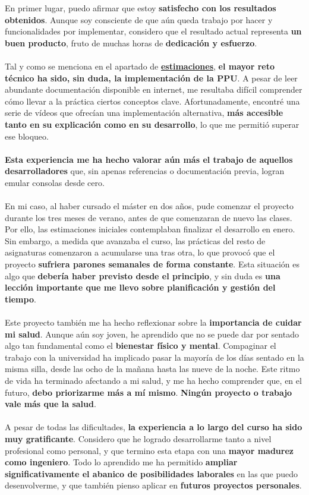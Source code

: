En primer lugar, puedo afirmar que estoy \textbf{satisfecho con los resultados obtenidos}. Aunque soy consciente de que aún queda trabajo por hacer y funcionalidades por implementar, considero que el resultado actual representa \textbf{un buen producto}, fruto de muchas horas de \textbf{dedicación y esfuerzo}.
\\\\
Tal y como se menciona en el apartado de \hyperref[estimaciones]{\textbf{estimaciones}}, \textbf{el mayor reto técnico ha sido, sin duda, la implementación de la PPU}. A pesar de leer abundante documentación disponible en internet, me resultaba difícil comprender cómo llevar a la práctica ciertos conceptos clave. Afortunadamente, encontré una serie de vídeos que ofrecían una implementación alternativa, \textbf{más accesible tanto en su explicación como en su desarrollo}, lo que me permitió superar ese bloqueo.
\\\\
\textbf{Esta experiencia me ha hecho valorar aún más el trabajo de aquellos desarrolladores} que, sin apenas referencias o documentación previa, logran emular consolas desde cero.
\\\\
En mi caso, al haber cursado el máster en dos años, pude comenzar el proyecto durante los tres meses de verano, antes de que comenzaran de nuevo las clases. Por ello, las estimaciones iniciales contemplaban finalizar el desarrollo en enero. Sin embargo, a medida que avanzaba el curso, las prácticas del resto de asignaturas comenzaron a acumularse una tras otra, lo que provocó que el proyecto \textbf{sufriera parones semanales de forma constante}. Esta situación es algo que \textbf{debería haber previsto desde el principio}, y sin duda es \textbf{una lección importante que me llevo sobre planificación y gestión del tiempo}.
\\\\
Este proyecto también me ha hecho reflexionar sobre la \textbf{importancia de cuidar mi salud}. Aunque aún soy joven, he aprendido que no se puede dar por sentado algo tan fundamental como el \textbf{bienestar físico y mental}. Compaginar el trabajo con la universidad ha implicado pasar la mayoría de los días sentado en la misma silla, desde las ocho de la mañana hasta las nueve de la noche. Este ritmo de vida ha terminado afectando a mi salud, y me ha hecho comprender que, en el futuro, \textbf{debo priorizarme más a mí mismo}. \textbf{Ningún proyecto o trabajo vale más que la salud}.
\\\\
A pesar de todas las dificultades, \textbf{la experiencia a lo largo del curso ha sido muy gratificante}. Considero que he logrado desarrollarme tanto a nivel profesional como personal, y que termino esta etapa con una \textbf{mayor madurez como ingeniero}. Todo lo aprendido me ha permitido \textbf{ampliar significativamente el abanico de posibilidades laborales} en las que puedo desenvolverme, y que también pienso aplicar en \textbf{futuros proyectos personales}.

